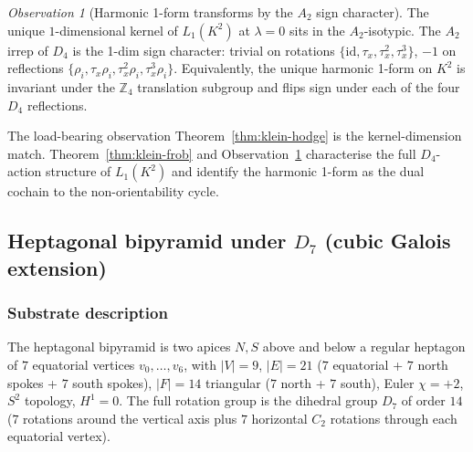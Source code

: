 \documentclass[12pt,a4paper]{article}
\theoremstyle{definition}
\theoremstyle{remark}
\newtheorem{observation}[theorem]{Observation}
\newcommand{\bZ}{\mathbb{Z}}
\providecommand{\id}{\mathrm{id}}
\begin{document}
\begin{observation}[Harmonic 1-form transforms by the $A_2$ sign character]\label{obs:klein-kernel-irrep}
The unique $1$-dimensional kernel of $L_1(K^2)$ at $\lambda = 0$ sits
in the $A_2$-isotypic. The $A_2$ irrep of $D_4$ is the 1-dim sign
character: trivial on rotations $\{\id, \tau_x, \tau_x^2, \tau_x^3\}$,
$-1$ on reflections $\{\rho_i, \tau_x \rho_i, \tau_x^2 \rho_i,
\tau_x^3 \rho_i\}$. Equivalently, the unique harmonic 1-form on $K^2$ is
invariant under the $\bZ_4$ translation subgroup and flips sign under
each of the four $D_4$ reflections.
\end{observation}

The load-bearing observation Theorem~\ref{thm:klein-hodge} is the
kernel-dimension match. Theorem~\ref{thm:klein-frob} and
Observation~\ref{obs:klein-kernel-irrep} characterise the full
$D_4$-action structure of $L_1(K^2)$ and identify the harmonic 1-form
as the dual cochain to the non-orientability cycle.

\subsection{Heptagonal bipyramid under $D_7$ (cubic Galois extension)}\label{sec:hept}

\subsubsection{Substrate description}\label{sec:hept-description}

The heptagonal bipyramid is two apices $N, S$ above and below a
regular heptagon of $7$ equatorial vertices $v_0, \ldots, v_6$, with
$|V| = 9$, $|E| = 21$ ($7$ equatorial + $7$ north spokes + $7$ south
spokes), $|F| = 14$ triangular ($7$ north + $7$ south),
Euler $\chi = +2$, $S^2$ topology, $H^1 = 0$. The full rotation group
is the dihedral group $D_7$ of order $14$ ($7$ rotations around the
vertical axis plus $7$ horizontal $C_2$ rotations through each
equatorial vertex).
\end{document}
